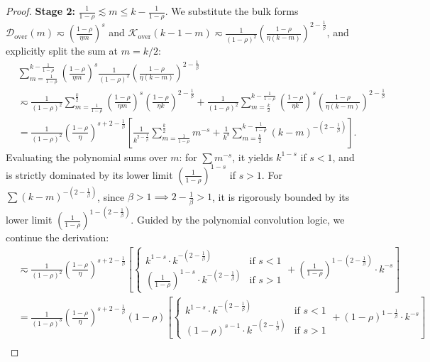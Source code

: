 \begin{proof}
\textbf{Stage 2:} $\frac{1}{1-\rho} \lesssim m \le k - \frac{1}{1-\rho}$. We substitute the bulk forms $\mathcal{D}_{\mathrm{over}}(m) \eqsim \left(\frac{1-\rho}{\eta m}\right)^s$ and $\mathcal{K}_{\mathrm{over}}(k-1-m) \eqsim \frac{1}{(1-\rho)^2} \left(\frac{1-\rho}{\eta (k-m)}\right)^{2-\frac{1}{\beta}}$, and explicitly split the sum at $m = k/2$:
\begin{align*}
    &\sum_{m=\frac{1}{1-\rho}}^{k-\frac{1}{1-\rho}} \left(\frac{1-\rho}{\eta m}\right)^s \frac{1}{(1-\rho)^2} \left(\frac{1-\rho}{\eta (k-m)}\right)^{2-\frac{1}{\beta}} \\
    &\eqsim \frac{1}{(1-\rho)^2} \sum_{m=\frac{1}{1-\rho}}^{\frac{k}{2}} \left(\frac{1-\rho}{\eta m}\right)^s \left(\frac{1-\rho}{\eta k}\right)^{2-\frac{1}{\beta}} + \frac{1}{(1-\rho)^2} \sum_{m=\frac{k}{2}}^{k-\frac{1}{1-\rho}} \left(\frac{1-\rho}{\eta k}\right)^s \left(\frac{1-\rho}{\eta (k-m)}\right)^{2-\frac{1}{\beta}} \\
    &= \frac{1}{(1-\rho)^2} \left( \frac{1-\rho}{\eta} \right)^{s+2-\frac{1}{\beta}} \left[ \frac{1}{k^{2-\frac{1}{\beta}}} \sum_{m=\frac{1}{1-\rho}}^{\frac{k}{2}} m^{-s} + \frac{1}{k^s} \sum_{m=\frac{k}{2}}^{k-\frac{1}{1-\rho}} (k-m)^{-\left(2-\frac{1}{\beta}\right)} \right].
\end{align*}
Evaluating the polynomial sums over $m$: for $\sum m^{-s}$, it yields $k^{1-s}$ if $s < 1$, and is strictly dominated by its lower limit $(\frac{1}{1-\rho})^{1-s}$ if $s > 1$. For $\sum (k-m)^{-(2-\frac{1}{\beta})}$, since $\beta > 1 \implies 2-\frac{1}{\beta} > 1$, it is rigorously bounded by its lower limit $(\frac{1}{1-\rho})^{1-(2-\frac{1}{\beta})}$. Guided by the polynomial convolution logic, we continue the derivation:
\begin{align*}
    &\eqsim \frac{1}{(1-\rho)^2} \left( \frac{1-\rho}{\eta} \right)^{s+2-\frac{1}{\beta}} \left[ \begin{cases} k^{1-s} \cdot k^{-\left(2-\frac{1}{\beta}\right)} & \text{if } s < 1 \\ \left(\frac{1}{1-\rho}\right)^{1-s} \cdot k^{-\left(2-\frac{1}{\beta}\right)} & \text{if } s > 1 \end{cases} + \left(\frac{1}{1-\rho}\right)^{1-\left(2-\frac{1}{\beta}\right)} \cdot k^{-s} \right] \\
    &= \frac{1}{(1-\rho)^3} \left( \frac{1-\rho}{\eta} \right)^{s+2-\frac{1}{\beta}} (1-\rho) \left[ \begin{cases} k^{1-s} \cdot k^{-\left(2-\frac{1}{\beta}\right)} & \text{if } s < 1 \\ (1-\rho)^{s-1} \cdot k^{-\left(2-\frac{1}{\beta}\right)} & \text{if } s > 1 \end{cases} + (1-\rho)^{1-\frac{1}{\beta}} \cdot k^{-s} \right] \\

\end{align*}
\end{proof}
